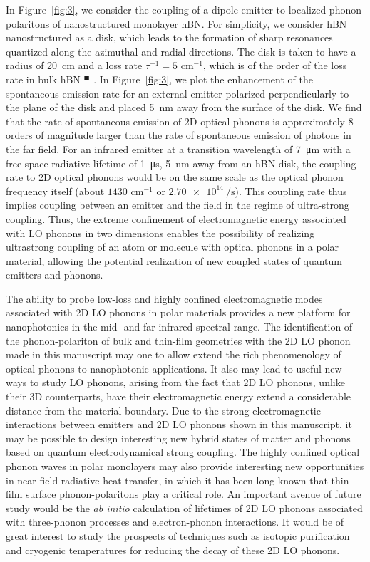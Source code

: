 \documentclass[aps,prb,twocolumn,
	           groupedaddress,superscriptaddress,
               amsfonts,amssymb,amsmath,floatfix,
	           citeautoscript]{revtex4-1}
\newcommand{\citeremind}[1]{%
	\unskip%
    \textcolor{blue!75!black!80!yellow}{${}^\blacksquare$%
	\ifthenelse{\isempty{#1}}{}{\textsuperscript{\tiny\textsf{#1}}}%
	}\xspace}
\begin{document}
In Figure~\ref{fig:3}, we consider the coupling of a dipole emitter to localized phonon-polaritons of nanostructured monolayer hBN. For simplicity, we consider hBN nanostructured as a disk, which leads to the formation of sharp resonances quantized along the azimuthal and radial directions. The disk is taken to have a radius of \SI{20}{cm} and a loss rate $\tau^{-1} = 5$ cm$^{-1}$, which is of the order of the loss rate in bulk hBN \citeremind{}. In Figure~\ref{fig:3}, we plot the enhancement of the spontaneous emission rate for an external emitter polarized perpendicularly to the plane of the disk and placed \SI{5}{\nm} away from the surface of the disk. We find that the rate of spontaneous emission of 2D optical phonons is approximately 8 orders of magnitude larger than the rate of spontaneous emission of photons in the far field. For an infrared emitter at a transition wavelength of \SI{7}{\micro\m} with a free-space radiative lifetime of \SI{1}{\micro\s}, \SI{5}{\nm} away from an hBN disk, the coupling rate to 2D optical phonons would be on the same scale as the optical phonon frequency itself (about $1430$ cm$^{-1}$ or $\SI{2.70e14}{\per\s}$). 
This coupling rate thus implies coupling between an emitter and the field in the regime of ultra-strong coupling. Thus, the extreme confinement of electromagnetic energy associated with LO phonons in two dimensions enables the possibility of realizing ultrastrong coupling of an atom or molecule with optical phonons in a polar material, allowing the potential realization of new coupled states of quantum emitters and phonons.

The ability to probe low-loss and highly confined electromagnetic modes associated with 2D LO phonons in polar materials provides a new platform for nanophotonics in the mid- and far-infrared spectral range. The identification of the phonon-polariton of bulk and thin-film geometries with the 2D LO phonon made in this manuscript may one to allow extend the rich phenomenology of optical phonons to nanophotonic applications. It also may lead to useful new ways to study LO phonons, arising from the fact that 2D LO phonons, unlike their 3D counterparts, have their electromagnetic energy extend a considerable distance from the material boundary. Due to the strong electromagnetic interactions between emitters and 2D LO phonons shown in this manuscript, it may be possible to design interesting new hybrid states of matter and phonons based on quantum electrodynamical strong coupling. The highly confined optical phonon waves in polar monolayers may also provide interesting new opportunities in near-field radiative heat transfer, in which it has been long known that thin-film surface phonon-polaritons play a critical role. An important avenue of future study would be the \textit{ab initio} calculation of lifetimes of 2D LO phonons associated with three-phonon processes and electron-phonon interactions. It would be of great interest to study the prospects of techniques such as isotopic purification and cryogenic temperatures for reducing the decay of these 2D LO phonons.
\end{document}
